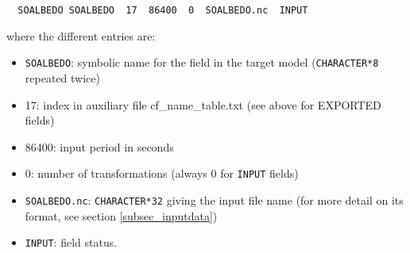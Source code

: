   \begin{verbatim}
  SOALBEDO SOALBEDO  17  86400  0  SOALBEDO.nc  INPUT\end{verbatim} where the different entries are:
  \begin{itemize}
  \item  {\tt SOALBEDO}: symbolic name for the field in the target
  model ({\tt CHARACTER*8} repeated twice)
  \item 17:  index in auxiliary file cf\_name\_table.txt (see above for EXPORTED fields)
  \item 86400: input period in seconds
  \item 0: number of transformations (always 0 for {\tt INPUT} fields)
  \item {\tt SOALBEDO.nc}: {\tt CHARACTER*32} giving the input file
  name (for more detail on its format, see section
  \ref{subsec_inputdata})
  \item {\tt INPUT}: field status.
  \end{itemize}


